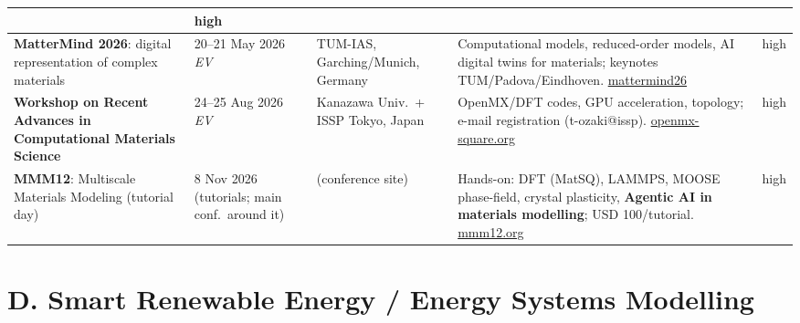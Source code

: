 \documentclass[11pt,a4paper]{article}
\newcommand{\ev}{\emph{EV}}
\begin{document}
\begin{longtable}{@{}p{3.2cm}p{3.0cm}p{2.5cm}p{5.2cm}p{1.6cm}@{}}
  & high \\
\midrule
\textbf{MatterMind 2026}: digital representation of complex materials
  & 20--21 May 2026 \ev{}
  & TUM-IAS, Garching/Munich, Germany
  & Computational models, reduced-order models, AI digital twins for materials; keynotes TUM/Padova/Eindhoven. \href{https://dmunipd.github.io/mattermind26/}{mattermind26}
  & high \\
\midrule
\textbf{Workshop on Recent Advances in Computational Materials Science}
  & 24--25 Aug 2026 \ev{}
  & Kanazawa Univ.\ + ISSP Tokyo, Japan
  & OpenMX/DFT codes, GPU acceleration, topology; e-mail registration (t-ozaki@issp). \href{https://www.openmx-square.org/workshop/meeting26/index.html}{openmx-square.org}
  & high \\
\midrule
\textbf{MMM12}: Multiscale Materials Modeling (tutorial day)
  & 8 Nov 2026 (tutorials; main conf.\ around it)
  & (conference site)
  & Hands-on: DFT (MatSQ), LAMMPS, MOOSE phase-field, crystal plasticity, \textbf{Agentic AI in materials modelling}; USD 100/tutorial. \href{https://www.mmm12.org/tutorial-sessions/}{mmm12.org}
  & high \\
\bottomrule
\end{longtable}

\section{D. Smart Renewable Energy / Energy Systems Modelling}
\end{document}
